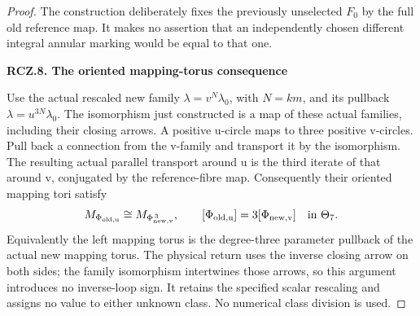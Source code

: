 \begin{proof}
The construction deliberately fixes the previously unselected
\(F_0\) by the full old reference map. It makes no assertion that an
independently chosen different integral annular marking would
be equal to that one.

\par

\medskip\noindent\textbf{RCZ.8. The oriented mapping-torus consequence}

\par\nobreak

Use the actual rescaled new family
\(\lambda=v^N\lambda_0\), with \(N=km\), and its pullback
\(\lambda=u^{3N}\lambda_0\). The isomorphism just constructed
is a map of these actual families, including their closing
arrows. A positive u-circle maps to three positive v-circles.
Pull back a connection from the v-family and transport it by
the isomorphism. The resulting actual parallel transport around
u is the third iterate of that around v, conjugated by the
reference-fibre map. Consequently their oriented mapping tori
satisfy
\[
 M_{\Phi_{\rm old,u}}\cong M_{\Phi_{\rm new,v}^{\,3}},
 \qquad
 [\Phi_{\rm old,u}]=3[\Phi_{\rm new,v}]\quad\text{in }\Theta_7.
\]
Equivalently the left mapping torus is the degree-three
parameter pullback of the actual new mapping torus. The
physical return uses the inverse closing arrow on both sides;
the family isomorphism intertwines those arrows, so this
argument introduces no inverse-loop sign. It retains the
specified scalar rescaling and assigns no value to either
unknown class. No numerical class division is used.

\end{proof}
